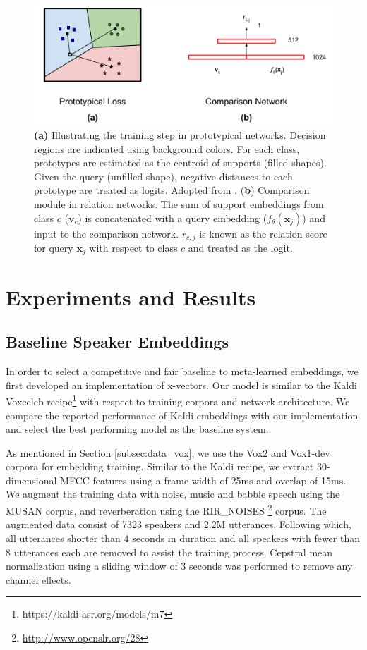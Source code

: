 \begin{figure}[h]
    \centering
    \includegraphics[width=\linewidth]{fig/meta_learning_lossfn.pdf}
    \caption{\textbf{(a)} Illustrating the training step in prototypical networks. Decision regions are indicated using background colors. For each class, prototypes are estimated as the centroid of supports (filled shapes). Given the query (unfilled shape), negative distances to each prototype are treated as logits. Adopted from \cite{koluguri2020}. (\textbf{b}) Comparison module in relation networks. The sum of support embeddings from class $c$ ($\mathbf{v}_c$) is concatenated with a query embedding ($f_\theta(\mathbf{x}_j)$) and input to the comparison network. $r_{c,j}$ is known as the relation score for query $\mathbf{x}_j$ with respect to class $c$ and treated as the logit.}
    \label{fig:metaLearningLoss}
\end{figure}

\section{Experiments and Results}
\label{sec:expts}

\subsection{Baseline Speaker Embeddings}
\label{subsec:exp_baseline}
In order to select a competitive and fair baseline to meta-learned embeddings, we first developed an implementation of x-vectors. %
Our model is similar to the Kaldi Voxceleb recipe\footnote{https://kaldi-asr.org/models/m7} with respect to training corpora and network architecture. We compare the reported performance of Kaldi embeddings with our implementation and select the best performing model as the baseline system.

As mentioned in Section \ref{subsec:data_vox}, we use the Vox2 and Vox1-dev corpora for embedding training. Similar to the Kaldi recipe, we extract 30-dimensional MFCC features using a frame width of 25ms and overlap of 15ms. We augment the training data with noise, music and babble speech using the MUSAN corpus\cite{snyder2015musan}, and reverberation using the RIR\_NOISES \footnote{\url{http://www.openslr.org/28}} corpus. The augmented data consist of 7323 speakers and 2.2M utterances. Following which, all utterances shorter than 4 seconds in duration and all speakers with fewer than 8 utterances each are removed to assist the training process. Cepstral mean normalization using a sliding window of 3 seconds was performed to remove any channel effects.

